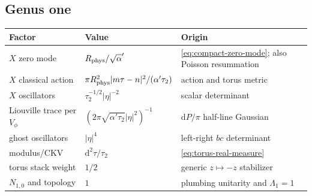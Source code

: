 \documentclass[11pt]{article}
\numberwithin{equation}{section}
\newcommand{\A}{\alpha'}
\newcommand{\dd}{\mathrm d}
\begin{document}
\subsection*{Genus one}
\begin{center}
\small
\begin{tabular}{@{}p{}p{}p{}@{}}
\toprule
Factor & Value & Origin \\
\midrule
$X$ zero mode & $R_{\rm phys}/\sqrt\A$ & \eqref{eq:compact-zero-mode}; also Poisson resummation \\
$X$ classical action & $\pi R_{\rm phys}^2|m\tau-n|^2/(\A\tau_2)$ & action and torus metric \\
$X$ oscillators & $\tau_2^{-1/2}|\eta|^{-2}$ & scalar determinant \\
Liouville trace per $V_\phi$ & $(2\pi\sqrt{\A\tau_2}|\eta|^2)^{-1}$ & $\dd P/\pi$ half-line Gaussian \\
ghost oscillators & $|\eta|^4$ & left-right $bc$ determinant \\
modulus/CKV & $\dd^2\tau/\tau_2$ & \eqref{eq:torus-real-measure} \\
torus stack weight & $1/2$ & generic $z\mapsto-z$ stabilizer \\
$N_{1,0}$ and topology & $1$ & plumbing unitarity and $\Lambda_1=1$ \\
\bottomrule
\end{tabular}
\end{center}
\end{document}
